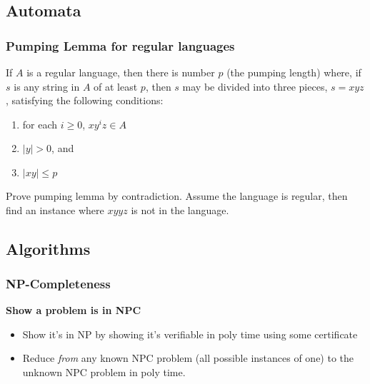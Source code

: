 \documentclass[7pt]{article}
\begin{document}
\begin{multicols*}{4}
\subsection*{Automata}

\subsubsection*{Pumping Lemma for regular languages}
If $A$ is a regular language, then there is number $p$ (the pumping length) where, if $s$ is any string in $A$ of at least $p$, then $s$ may be divided into three pieces, $s = xyz$, satisfying the following conditions:
\begin{enumerate}
\item for each $i \geq 0$, $xy^iz \in A$
\item $|y| > 0$, and
\item $|xy| \leq p$
\end{enumerate}

Prove pumping lemma by contradiction.  Assume the language is regular, then find an instance where $xyyz$ is not in the language.




\subsection*{Algorithms}
\subsubsection*{NP-Completeness}
{\bf Show a problem is in NPC}
\begin{itemize}
\item Show it's in NP by showing it's verifiable in poly time using
  some certificate
\item Reduce \emph{from} any known NPC problem (all possible instances
  of one) to the unknown NPC problem in poly time.
\end{itemize}


\end{multicols*}
\end{document}
